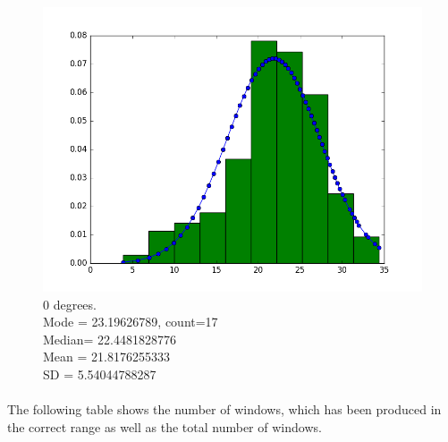 \documentclass[12pt]{article}
\numberwithin{figure}{section}
\numberwithin{table}{section}
\begin{document}
\begin{figure}[H]
\begin{minipage}[b]{0.4\textwidth}
    \includegraphics[width=\textwidth]{angle0.png}
    \caption[Estimation at angle 0 degrees]{0 degrees.
    \\\hspace{\textwidth}Mode   = 23.19626789, count=17
	\\\hspace{\textwidth}	Median= 22.4481828776
	\\\hspace{\textwidth}	Mean   = 21.8176255333
	\\\hspace{\textwidth}	SD       = 5.54044788287}
  \end{minipage}
\end{figure}
\paragraph{}
The following table shows the number of windows, which has been produced in the correct range as well as the total number of windows.
\end{document}
